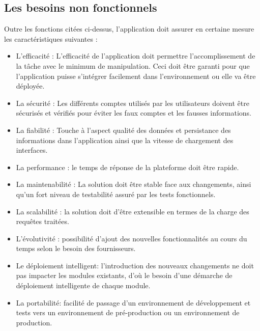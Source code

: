 \subsection{Les besoins non fonctionnels}
Outre les fonctions cit\'ees ci-dessus, l'application doit assurer en certaine mesure les caract\'eristiques suivantes :
\begin{itemize}
\item L'efficacit\'e : L'efficacit\'e de l'application doit permettre l'accomplissement de la t\^ache avec le minimum de manipulation. Ceci doit \^etre garanti pour que l'application puisse s'int\'egrer facilement dans l'environnement ou elle va \^etre d\'eploy\'ee.

\item La s\'ecurit\'e : Les diff\'erents comptes utilis\'es par les utilisateurs doivent \^etre s\'ecuris\'es et v\'erifi\'es pour \'eviter les faux comptes et les fausses informations.

\item La fiabilit\'e : Touche \`a l'aspect qualit\'e des donn\'ees et persistance des informations dans l'application ainsi que la vitesse de chargement des interfaces.
\item La performance : le temps de r\'eponse de la plateforme doit \^etre rapide.

\item La maintenabilit\'e : La solution doit \^etre stable face aux changements, ainsi qu'un fort niveau de testabilit\'e assur\'e par les tests fonctionnels.

\item La scalabilit\'e : la solution doit d'\^etre extensible en termes de la charge des requ\^etes trait\'ees.

\item L'\'evolutivit\'e : possibilit\'e d'ajout des nouvelles fonctionnalit\'es au cours du temps selon le besoin des fournisseurs.

\item Le d\'eploiement intelligent: l'introduction des nouveaux changements ne doit pas impacter les modules existants, d'o\`u le besoin d'une d\'emarche de d\'eploiement intelligente de chaque module.

\item La portabilit\'e: facilit\'e de passage d'un environnement de d\'eveloppement et tests vers un environnement de pr\'e-production ou un environnement de production.
\end{itemize} 


